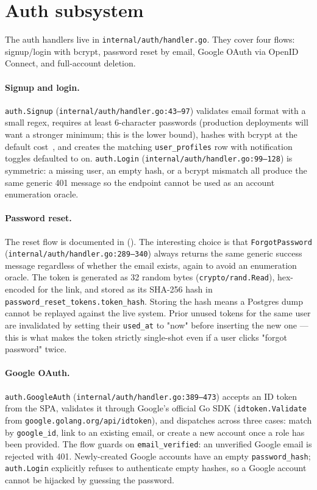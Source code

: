 \section{Auth subsystem}

The auth handlers live in \texttt{internal/auth/handler.go}. They cover four flows: signup/login with bcrypt, password reset by email, Google OAuth via OpenID Connect, and full-account deletion.

\paragraph{Signup and login.} \texttt{auth.Signup} (\texttt{internal/auth/handler.go:43--97}) validates email format with a small regex, requires at least 6-character passwords (production deployments will want a stronger minimum; this is the lower bound), hashes with bcrypt at the default cost~\cite{provos1999bcrypt}, and creates the matching \texttt{user\_profiles} row with notification toggles defaulted to on. \texttt{auth.Login} (\texttt{internal/auth/handler.go:99--128}) is symmetric: a missing user, an empty hash, or a bcrypt mismatch all produce the same generic 401 message so the endpoint cannot be used as an account enumeration oracle.

\paragraph{Password reset.} The reset flow is documented in  (). The interesting choice is that \texttt{ForgotPassword} (\texttt{internal/auth/handler.go:289--340}) always returns the same generic success message regardless of whether the email exists, again to avoid an enumeration oracle. The token is generated as 32 random bytes (\texttt{crypto/rand.Read}), hex-encoded for the link, and stored as its SHA-256 hash in \texttt{password\_reset\_tokens.token\_hash}. Storing the hash means a Postgres dump cannot be replayed against the live system. Prior unused tokens for the same user are invalidated by setting their \texttt{used\_at} to "now" before inserting the new one --- this is what makes the token strictly single-shot even if a user clicks "forgot password" twice.

\paragraph{Google OAuth.} \texttt{auth.GoogleAuth} (\texttt{internal/auth/handler.go:389--473}) accepts an ID token from the SPA, validates it through Google's official Go SDK (\texttt{idtoken.Validate} from \texttt{google.golang.org/api/idtoken}), and dispatches across three cases: match by \texttt{google\_id}, link to an existing email, or create a new account once a role has been provided. The flow guards on \texttt{email\_verified}: an unverified Google email is rejected with 401. Newly-created Google accounts have an empty \texttt{password\_hash}; \texttt{auth.Login} explicitly refuses to authenticate empty hashes, so a Google account cannot be hijacked by guessing the password.

